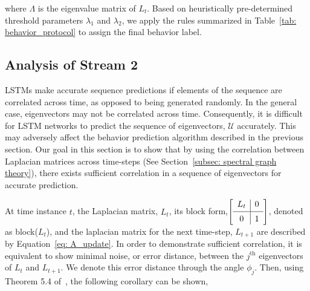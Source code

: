 \documentclass[10pt,twocolumn,letterpaper]{article}
\newcommand{\mc}[1]{\mathcal{#1}}
\newcommand\Tstrut{\rule{0pt}{2.6ex}}         \newcommand\Bstrut{\rule[-1.3ex]{0pt}{0pt}}   \newcommand\mathdash{\text{\normalfont --}}
\theoremstyle{plain}
\begin{document}
\noindent where $\Lambda$ is the eigenvalue matrix of $L_t$. Based on heuristically pre-determined threshold parameters $\lambda_1$ and $\lambda_2$, we apply the rules summarized in Table~\ref{tab: behavior_protocol} to assign the final behavior label.
\begin{table}[t]
  \caption{\textbf{Behavior Definitions:} Definitions of the different types of road-agent behaviors. $\lambda_1, \lambda_2$ are constant threshold parameters.}
  \label{tab: behavior_protocol}
  \centering
\vspace{-5pt}
\end{table}
 


\subsection{Analysis of Stream 2}
\label{subsec: analysis}


LSTMs make accurate sequence predictions if elements of the sequence are correlated across time, as opposed to being generated randomly. In the general case, eigenvectors may not be correlated across time. Consequently, it is difficult for LSTM networks to predict the sequence of eigenvectors, $\mc{U}$ accurately. This may adversely affect the behavior prediction algorithm described in the previous section. Our goal in this section is to show that by using the correlation between Laplacian matrices across time-steps (See Section~\ref{subsec: spectral graph theory}), there exists sufficient correlation in a sequence of eigenvectors for accurate prediction.

At time instance $t$, the Laplacian matrix, $L_t$, its block form,$
\left[ 
\begin{array}{c|c}
L_{t} \Bstrut & 0 \Bstrut\\
\hline
0 \Tstrut & 1
\end{array}
\right ]$, denoted as block($L_t$), and the laplacian matrix for the next time-step, $L_{t+1}$ are described by Equation~\ref{eq: A_update}. In order to demonstrate sufficient correlation, it is equivalent to show minimal noise, or error distance, between the $j^{\textrm{th}}$ eigenvectors of $L_t$ and $L_{t+1}$. We denote this error distance through the angle $\phi_j$. Then, using Theorem 5.4 of~\cite{demmel1997applied}, the following corollary can be shown,
\end{document}
